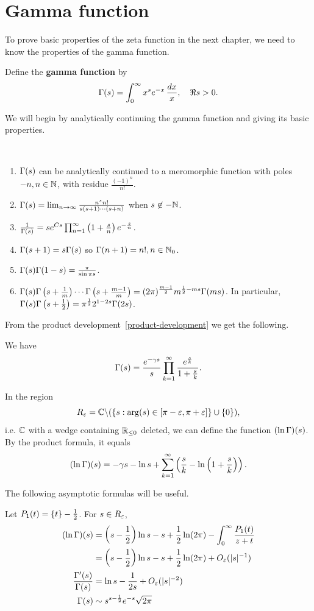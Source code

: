 \section{Gamma function}
To prove basic properties of the zeta function in the next chapter, we need to know the properties of the gamma function.
\begin{df}
Define the \textbf{gamma function} by
\[
\Gamma(s)=\int_0^{\infty} x^{s} e^{-x} \,\frac{dx}{x} , \quad \Re s>0.
\]
\end{df}
We will begin by analytically continuing the gamma function and giving its basic properties.
\begin{pr}$\,$
\begin{enumerate}
\item
$\Gamma(s)$ can be analytically continued to a meromorphic function with poles $-n,n\in \mathbb{N}$, with residue $\frac{(-1)^n}{n!}$.
\item
$\Gamma(s)=\lim_{n\to \infty} \frac{n^s n!}{s(s+1)\cdots (s+n)}$ when $s\not\in -\mathbb{N}$.
\item 
$\frac{1}{\Gamma(s)}=se^{Cs}\prod_{n=1}^{\infty} \left( {1+\frac sn} \right)e^{-\frac sn}$.
\item 
$\Gamma(s+1)=s\Gamma(s)$ so $\Gamma(n+1)=n!,n\in \mathbb{N}_0$.
\item 
$\Gamma(s)\Gamma(1-s)=\frac{\pi}{\sin \pi s}$.
\item
$\Gamma(s)\Gamma\left( {s+\frac{1}{m}} \right)\cdots\Gamma\left( {s+\frac{m-1}m} \right)=(2\pi)^{\frac{m-1}2} m^{\frac{1}{2} -ms} \Gamma(ms)$. In particular, $\Gamma(s)\Gamma\left( {s+\frac{1}{2}} \right) =\pi^{\frac{1}{2}} 2^{1-2s}\Gamma(2s)$.
\end{enumerate}
From the product development~\ref{product-development} we get the following.
\begin{thm}
We have
\[
\Gamma(s)=\frac{e^{-\gamma s}}{s}\prod_{k=1}^{\infty} 
\frac{e^{\frac sk}}{1+\frac sk}.
\]
\end{thm}
In the region
\[
R_{\varepsilon}=\mathbb{C}\backslash (\left\{{s}:{\arg(s)\in [\pi-\varepsilon,\pi+\varepsilon]}\right\}\cup \{0\}),
\]
i.e. $\mathbb{C}$ with a wedge containing $\mathbb{R}_{\le 0}$ deleted, we can define the function $(\ln \Gamma)(s)$. By the product formula, it equals
\[
(\ln \Gamma)(s)=-\gamma s -\ln s +\sum_{k=1}^{\infty} \left( {\frac sk -\ln \left( {1+\frac{s}{k}} \right)} \right).
\]

The following asymptotic formulas will be useful.
\begin{thm}
Let $P_1(t)=\{t\}-\frac{1}{2}$. For $s\in R_{\varepsilon}$,
\begin{align*}
(\ln \Gamma)(s)&=\left( {s-\frac{1}{2}} \right)\ln s-s+\frac{1}{2}\ln(2\pi)-
\int_0^{\infty}\frac{P_1(t)}{z+t}\\
&=\left( {s-\frac{1}{2}} \right)\ln s-s+\frac{1}{2}\ln(2\pi)+O_{\varepsilon}(|s|^{-1})\\
\frac{\Gamma'(s)}{\Gamma(s)}&=\ln s-\frac{1}{2s} +O_{\varepsilon}(|s|^{-2})\\
\Gamma(s)&\sim s^{s-\frac{1}{2}} e^{-s}\sqrt{2\pi}
\end{align*}
\end{thm}
\end{pr}
